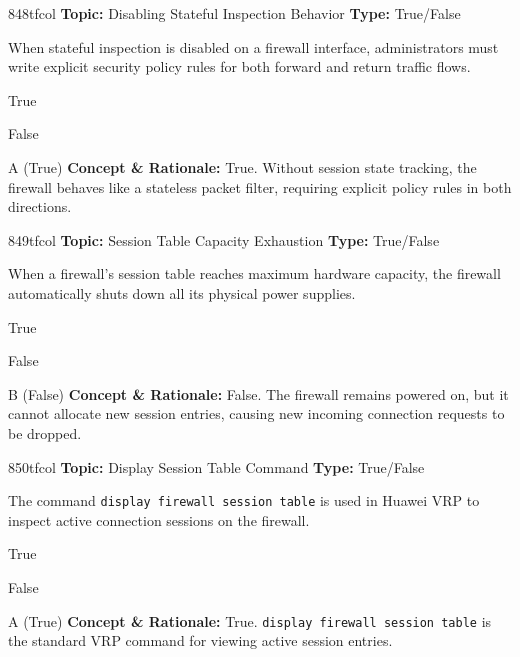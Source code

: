 \begin{qcard}{848}{tfcol}
\textcolor{darkslate!75}{\small\textbf{Topic:} Disabling Stateful Inspection Behavior \hfill \textbf{Type:} True/False}\vspace{0.4em}\par
When stateful inspection is disabled on a firewall interface, administrators must write explicit security policy rules for both forward and return traffic flows.
\begin{qoptions}
\item True
\item False
\end{qoptions}
\end{qcard}
\nopagebreak
\begin{explainbox}{A (True)}
\textbf{Concept \& Rationale:} True. Without session state tracking, the firewall behaves like a stateless packet filter, requiring explicit policy rules in both directions.
\end{explainbox}

\begin{qcard}{849}{tfcol}
\textcolor{darkslate!75}{\small\textbf{Topic:} Session Table Capacity Exhaustion \hfill \textbf{Type:} True/False}\vspace{0.4em}\par
When a firewall's session table reaches maximum hardware capacity, the firewall automatically shuts down all its physical power supplies.
\begin{qoptions}
\item True
\item False
\end{qoptions}
\end{qcard}
\nopagebreak
\begin{explainbox}{B (False)}
\textbf{Concept \& Rationale:} False. The firewall remains powered on, but it cannot allocate new session entries, causing new incoming connection requests to be dropped.
\end{explainbox}

\begin{qcard}{850}{tfcol}
\textcolor{darkslate!75}{\small\textbf{Topic:} Display Session Table Command \hfill \textbf{Type:} True/False}\vspace{0.4em}\par
The command \texttt{display firewall session table} is used in Huawei VRP to inspect active connection sessions on the firewall.
\begin{qoptions}
\item True
\item False
\end{qoptions}
\end{qcard}
\nopagebreak
\begin{explainbox}{A (True)}
\textbf{Concept \& Rationale:} True. \texttt{display firewall session table} is the standard VRP command for viewing active session entries.
\end{explainbox}

